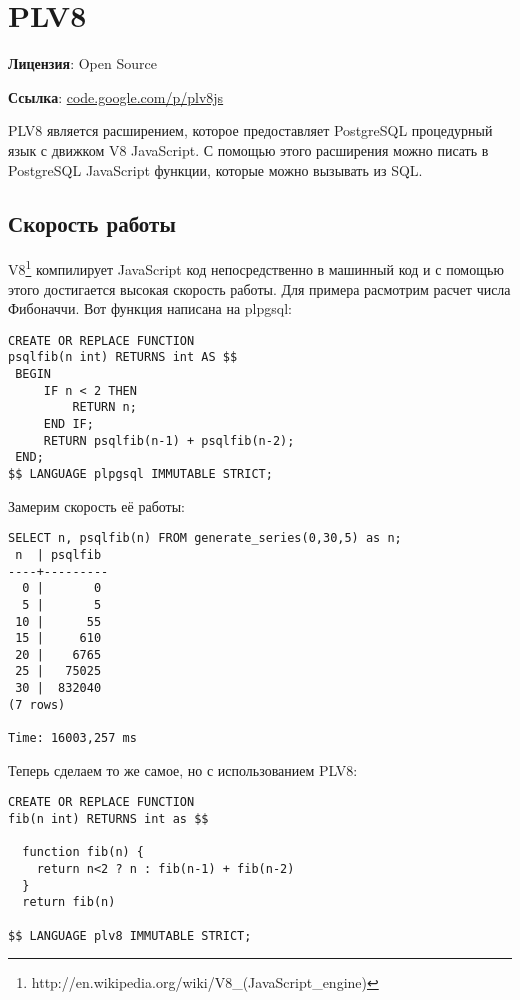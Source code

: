 \section{PLV8}
\textbf{Лицензия}: Open Source

\textbf{Ссылка}: \href{http://code.google.com/p/plv8js/}{code.google.com/p/plv8js}

PLV8 является расширением, которое предоставляет PostgreSQL процедурный язык с движком V8 JavaScript. С помощью этого расширения можно писать в PostgreSQL JavaScript функции, которые можно вызывать из SQL.

\subsection{Скорость работы}

V8\footnote{http://en.wikipedia.org/wiki/V8\_(JavaScript\_engine)} компилирует JavaScript код непосредственно в машинный код и с помощью этого достигается высокая скорость работы. Для примера расмотрим расчет числа Фибоначчи. Вот функция написана на plpgsql:

\begin{lstlisting}[label=lst:plv8js1,caption=Фибоначчи на plpgsql]
CREATE OR REPLACE FUNCTION
psqlfib(n int) RETURNS int AS $$
 BEGIN
     IF n < 2 THEN
         RETURN n;
     END IF;
     RETURN psqlfib(n-1) + psqlfib(n-2);
 END;
$$ LANGUAGE plpgsql IMMUTABLE STRICT;
\end{lstlisting}

Замерим скорость её работы:

\begin{lstlisting}[label=lst:plv8js2,caption=Скорость расчета числа Фибоначчи на plpgsql]
SELECT n, psqlfib(n) FROM generate_series(0,30,5) as n;
 n  | psqlfib
----+---------
  0 |       0
  5 |       5
 10 |      55
 15 |     610
 20 |    6765
 25 |   75025
 30 |  832040
(7 rows)

Time: 16003,257 ms
\end{lstlisting}

Теперь сделаем то же самое, но с использованием PLV8:

\begin{lstlisting}[label=lst:plv8js3,caption=Фибоначчи на plv8]
CREATE OR REPLACE FUNCTION
fib(n int) RETURNS int as $$

  function fib(n) {
    return n<2 ? n : fib(n-1) + fib(n-2)
  }
  return fib(n)

$$ LANGUAGE plv8 IMMUTABLE STRICT;
\end{lstlisting}

